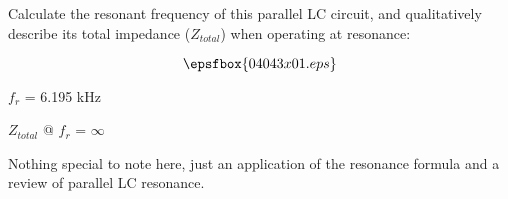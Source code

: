 

Calculate the resonant frequency of this parallel LC circuit, and qualitatively describe its total impedance ($Z_{total}$) when operating at resonance:

$$\epsfbox{04043x01.eps}$$







$f_r$ = 6.195 kHz

\vskip 10pt

$Z_{total}$ @ $f_r$ = $\infty$







Nothing special to note here, just an application of the resonance formula and a review of parallel LC resonance.




